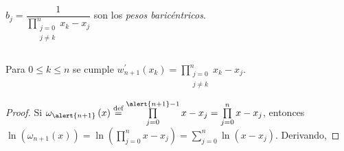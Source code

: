 \begin{frame}
\begin{definition}
\begin{columns}
\begin{column}{.45\paperwidth}
\begin{itemize}
					      \begin{math}
						      b_{j}=
						      \dfrac{1}{
						      \prod\limits_{\substack{j=0\\j\neq k}}^{n}
						      x_{k}-x_{j}
						      }
					      \end{math}
					      son los \emph{pesos baricéntricos}.
				\end{itemize}
			\end{column}
		\end{columns}
	\end{definition}
\end{frame}

\begin{frame}
	\begin{theorem}
		Para $0\leq k\leq n$ se cumple
		\begin{math}
			w^{\prime}_{n+1}
			\left(x_{k}\right)=
			\prod\limits_{\substack{j=0\\j\neq k}}^{n}
			x_{k}-x_{j}.
		\end{math}
	\end{theorem}

	\begin{proof}
		Si
		\begin{math}
			\omega_{\alert{n+1}}
			\left(x\right)
			\overset{\text{def}}{=}
			\prod\limits_{j=0}^{\alert{n+1}-1}
			x-x_{j}=
			\prod\limits_{j=0}^{n}
			x-x_{j}
		\end{math}, entonces
		\begin{math}
			\ln
			\left(
			\omega_{n+1}
			\left(x\right)
			\right)=
			\ln
			\left(
			\prod\limits_{j=0}^{n}
			x-x_{j}
			\right)=
			\sum\limits_{j=0}^{n}
			\ln
			\left(
			x-x_{j}
			\right)
		\end{math}.
		Derivando,


\end{proof}
\end{frame}
